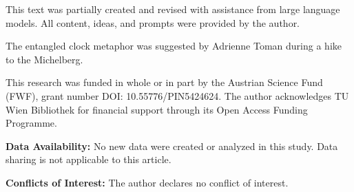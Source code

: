 \documentclass[reprint,aps,pra,longbibliography]{revtex4-2}
\begin{document}
\begin{acknowledgments}
This text was partially created and revised with assistance from large language models. All content, ideas, and prompts were provided by the author.

The entangled clock metaphor was suggested by Adrienne Toman during a hike to the Michelberg.

This research was funded in whole or in part by the Austrian Science Fund (FWF), grant number DOI: 10.55776/PIN5424624. The author acknowledges TU Wien Bibliothek for financial support through its Open Access Funding Programme.

\textbf{Data Availability:} No new data were created or analyzed in this study. Data sharing is not applicable to this article.

\textbf{Conflicts of Interest:} The author declares no conflict of interest.

\end{acknowledgments}


\end{document}
